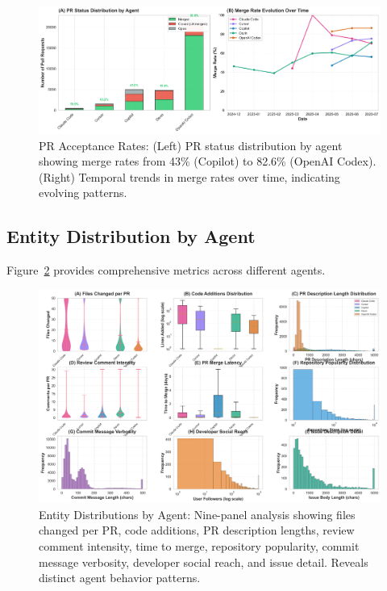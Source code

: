 \documentclass[11pt]{article}
\begin{document}
\begin{figure}[H]
\centering
\includegraphics[width=\textwidth]{figures/fig2_pr_acceptance_rates.png}
\caption{PR Acceptance Rates: (Left) PR status distribution by agent showing merge rates from 43\% (Copilot) to 82.6\% (OpenAI Codex). (Right) Temporal trends in merge rates over time, indicating evolving patterns.}
\label{fig:pr_acceptance}
\end{figure}

\subsection{Entity Distribution by Agent}

Figure~\ref{fig:entity_dist} provides comprehensive metrics across different agents.

\begin{figure}[H]
\centering
\includegraphics[width=\textwidth]{figures/fig3_entity_distributions.png}
\caption{Entity Distributions by Agent: Nine-panel analysis showing files changed per PR, code additions, PR description lengths, review comment intensity, time to merge, repository popularity, commit message verbosity, developer social reach, and issue detail. Reveals distinct agent behavior patterns.}
\label{fig:entity_dist}
\end{figure}
\end{document}
